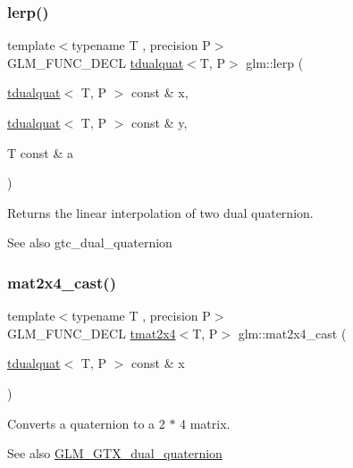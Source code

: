 \subsubsection{\texorpdfstring{lerp()}{lerp()}}
{\footnotesize\ttfamily template$<$typename T , precision P$>$ \\
G\+L\+M\+\_\+\+F\+U\+N\+C\+\_\+\+D\+E\+CL \hyperlink{structglm_1_1tdualquat}{tdualquat}$<$T, P$>$ glm\+::lerp (\begin{DoxyParamCaption}\item[{\hyperlink{structglm_1_1tdualquat}{tdualquat}$<$ T, P $>$ const \&}]{x,  }\item[{\hyperlink{structglm_1_1tdualquat}{tdualquat}$<$ T, P $>$ const \&}]{y,  }\item[{T const \&}]{a }\end{DoxyParamCaption})}

Returns the linear interpolation of two dual quaternion.

\begin{DoxySeeAlso}{See also}
gtc\+\_\+dual\+\_\+quaternion 
\end{DoxySeeAlso}
\mbox{\label{group__gtx__dual__quaternion_ga2d124748183e12db8288eeaca350298e}} 
\subsubsection{\texorpdfstring{mat2x4\+\_\+cast()}{mat2x4\_cast()}}
{\footnotesize\ttfamily template$<$typename T , precision P$>$ \\
G\+L\+M\+\_\+\+F\+U\+N\+C\+\_\+\+D\+E\+CL \hyperlink{structglm_1_1tmat2x4}{tmat2x4}$<$T, P$>$ glm\+::mat2x4\+\_\+cast (\begin{DoxyParamCaption}\item[{\hyperlink{structglm_1_1tdualquat}{tdualquat}$<$ T, P $>$ const \&}]{x }\end{DoxyParamCaption})}

Converts a quaternion to a 2 $\ast$ 4 matrix.

\begin{DoxySeeAlso}{See also}
\hyperlink{group__gtx__dual__quaternion}{G\+L\+M\+\_\+\+G\+T\+X\+\_\+dual\+\_\+quaternion} 
\end{DoxySeeAlso}
\mbox{\label{group__gtx__dual__quaternion_ga576745d979e3c079a64152490c816954}} 
